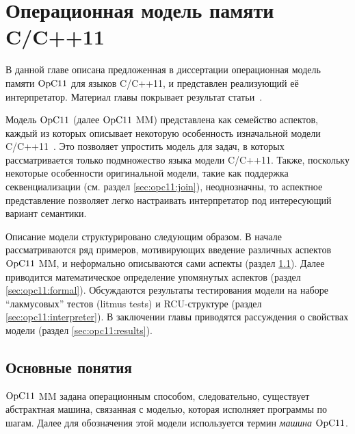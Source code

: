 \chapter{Операционная модель памяти C/C++11} \label{sec:opc11}
В данной главе описана предложенная в диссертации операционная модель
памяти $\mathrm{OpC11}$ для языков C/C++11, и представлен реализующий её интерпретатор.
Материал главы покрывает результат статьи~\cite{Podkopaev-al:CoRR16}.

Модель $\mathrm{OpC11}$ (далее $\mathrm{OpC11}$ MM) представлена как семейство аспектов, каждый из которых описывает некоторую особенность
изначальной модели C/C++11~\cite{Batty-al:POPL11}.
Это позволяет упростить модель для задач, в которых рассматривается только подмножество
языка модели C/C++11.
Также, поскольку некоторые особенности оригинальной модели,
такие как поддержка секвенциализации (см. раздел \ref{sec:opc11:join}), неоднозначны,
то аспектное представление позволяет легко настраивать интерпретатор под интересующий
вариант семантики.


Описание модели структурировано следующим образом.
В начале рассматриваются ряд примеров, мотивирующих введение
различных аспектов $\mathrm{OpC11}$ MM,
и неформально описываются сами аспекты (раздел \ref{sec:opc11:base}).
Далее приводится математическое определение упомянутых аспектов
(раздел \ref{sec:opc11:formal}).
Обсуждаются результаты тестирования модели на наборе ``лакмусовых'' тестов (litmus tests) и
RCU-структуре (раздел \ref{sec:opc11:interpreter}).
В заключении главы приводятся рассуждения о свойствах модели (раздел \ref{sec:opc11:results}).

\section{Основные понятия}
\label{sec:opc11:base}
\label{sec:opc11:fullmodel}
$\mathrm{OpC11}$ MM задана операционным способом, следовательно, существует
абстрактная машина, связанная с моделью, которая исполняет программы
по шагам.
Далее для обозначения этой модели используется термин \emph{машина} $\mathrm{OpC11}$.


